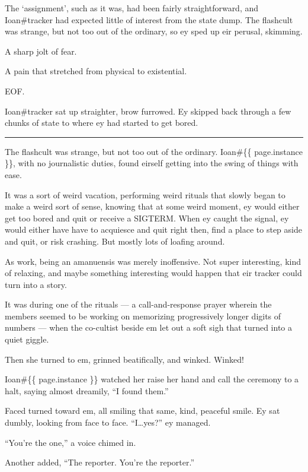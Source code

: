 The `assignment', such as it was, had been fairly straightforward, and Ioan\#tracker had expected little of interest from the state dump. The flashcult was strange, but not too out of the ordinary, so ey sped up eir perusal, skimming.

A sharp jolt of fear.

A pain that stretched from physical to existential.

EOF.

Ioan\#tracker sat up straighter, brow furrowed. Ey skipped back through a few chunks of state to where ey had started to get bored.

\begin{center}\rule{0.5\linewidth}{\linethickness}\end{center}

The flashcult was strange, but not too out of the ordinary. Ioan\#\{\{ page.instance \}\}, with no journalistic duties, found eirself getting into the swing of things with ease.

It was a sort of weird vacation, performing weird rituals that slowly began to make a weird sort of sense, knowing that at some weird moment, ey would either get too bored and quit or receive a SIGTERM. When ey caught the signal, ey would either have have to acquiesce and quit right then, find a place to step aside and quit, or risk crashing. But mostly lots of loafing around.

As work, being an amanuensis was merely inoffensive. Not super interesting, kind of relaxing, and maybe something interesting would happen that eir tracker could turn into a story.

It was during one of the rituals --- a call-and-response prayer wherein the members seemed to be working on memorizing progressively longer digits of numbers --- when the co-cultist beside em let out a soft sigh that turned into a quiet giggle.

Then she turned to em, grinned beatifically, and winked. Winked!

Ioan\#\{\{ page.instance \}\} watched her raise her hand and call the ceremony to a halt, saying almost dreamily, ``I found them.''

Faced turned toward em, all smiling that same, kind, peaceful smile. Ey sat dumbly, looking from face to face. ``I\ldots{}yes?'' ey managed.

``You're the one,'' a voice chimed in.

Another added, ``The reporter. You're the reporter.''

